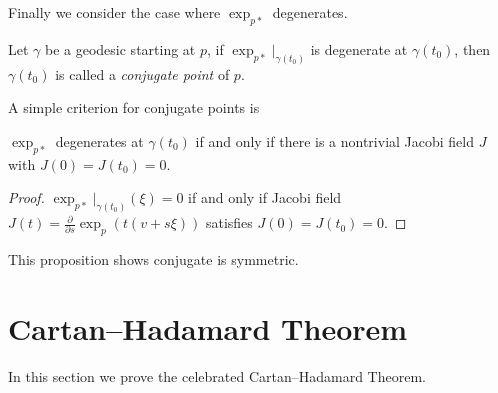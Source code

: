 Finally we consider the case where $\exp_{p*}$ degenerates.
\begin{defn}
    Let $\gamma$ be a geodesic starting at $p$, if $\exp_{p*}|_{\gamma(t_0)}$ is degenerate at $\gamma(t_0)$, then $\gamma(t_0)$ is called a \emph{conjugate point} of $p$.
\end{defn}

A simple criterion for conjugate points is
\begin{prop}
    $\exp_{p*}$ degenerates at $\gamma(t_0)$ if and only if there is a nontrivial Jacobi field $J$ with $J(0)=J(t_0)=0$.
\end{prop}
\begin{proof}
    $\exp_{p*}|_{\gamma(t_0)}(\xi)=0$ if and only if Jacobi field $J(t)=\frac{\partial{}}{\partial{s}}\exp_p(t(v+s\xi))$ satisfies $J(0)=J(t_0)=0$.
\end{proof}

\begin{rem}
    This proposition shows conjugate is symmetric.
\end{rem}

\section{Cartan--Hadamard Theorem}
In this section we prove the celebrated Cartan--Hadamard Theorem.